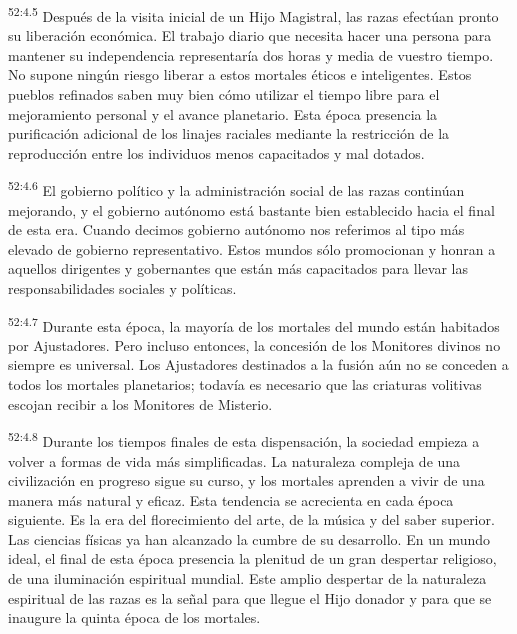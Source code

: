 \par
\textsuperscript{52:4.5} Después de la visita inicial de un Hijo Magistral, las razas efectúan pronto su liberación económica. El trabajo diario que necesita hacer una persona para mantener su independencia representaría dos horas y media de vuestro tiempo. No supone ningún riesgo liberar a estos mortales éticos e inteligentes. Estos pueblos refinados saben muy bien cómo utilizar el tiempo libre para el mejoramiento personal y el avance planetario. Esta época presencia la purificación adicional de los linajes raciales mediante la restricción de la reproducción entre los individuos menos capacitados y mal dotados.

\par
\textsuperscript{52:4.6} El gobierno político y la administración social de las razas continúan mejorando, y el gobierno autónomo está bastante bien establecido hacia el final de esta era. Cuando decimos gobierno autónomo nos referimos al tipo más elevado de gobierno representativo. Estos mundos sólo promocionan y honran a aquellos dirigentes y gobernantes que están más capacitados para llevar las responsabilidades sociales y políticas.

\par
\textsuperscript{52:4.7} Durante esta época, la mayoría de los mortales del mundo están habitados por Ajustadores. Pero incluso entonces, la concesión de los Monitores divinos no siempre es universal. Los Ajustadores destinados a la fusión aún no se conceden a todos los mortales planetarios; todavía es necesario que las criaturas volitivas escojan recibir a los Monitores de Misterio.

\par
\textsuperscript{52:4.8} Durante los tiempos finales de esta dispensación, la sociedad empieza a volver a formas de vida más simplificadas. La naturaleza compleja de una civilización en progreso sigue su curso, y los mortales aprenden a vivir de una manera más natural y eficaz. Esta tendencia se acrecienta en cada época siguiente. Es la era del florecimiento del arte, de la música y del saber superior. Las ciencias físicas ya han alcanzado la cumbre de su desarrollo. En un mundo ideal, el final de esta época presencia la plenitud de un gran despertar religioso, de una iluminación espiritual mundial. Este amplio despertar de la naturaleza espiritual de las razas es la señal para que llegue el Hijo donador y para que se inaugure la quinta época de los mortales.

